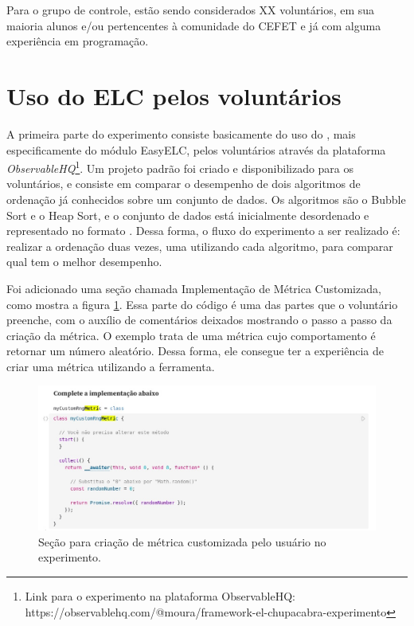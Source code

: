 \documentclass[12pt]{tcc}
\begin{document}
	Para o grupo de controle, estão sendo considerados XX voluntários, em sua maioria alunos e/ou pertencentes à comunidade do CEFET e já com alguma experiência em programação. 


	\section{Uso do ELC pelos voluntários}
	\label{section:parte-1-experimento}




	A primeira parte do experimento consiste basicamente do uso do , mais especificamente do módulo EasyELC, pelos voluntários através da plataforma \emph{ObservableHQ}\footnote{Link para o experimento na plataforma ObservableHQ: https://observablehq.com/@moura/framework-el-chupacabra-experimento}. Um projeto padrão foi criado e disponibilizado para os voluntários, e consiste em comparar o desempenho de dois algoritmos de ordenação já conhecidos sobre um conjunto de dados. Os algoritmos são o Bubble Sort e o Heap Sort, e o conjunto de dados está inicialmente desordenado e representado no formato . Dessa forma, o fluxo do experimento a ser realizado é: realizar a ordenação duas vezes, uma utilizando cada algoritmo, para comparar qual tem o melhor desempenho.

	Foi adicionado uma seção chamada Implementação de Métrica Customizada, como mostra a figura \ref{fig:metrica-observable}. Essa parte do código é uma das partes que o voluntário preenche, com o auxílio de comentários deixados mostrando o passo a passo da criação da métrica. O exemplo trata de uma métrica cujo comportamento é retornar um número aleatório. Dessa forma, ele consegue ter a experiência de criar uma métrica utilizando a ferramenta.

	\begin{figure}[!ht]
		\centering
		\includegraphics[width=1\textwidth]{figures/experimento-metrica.jpeg}
		\caption{Seção para criação de métrica customizada pelo usuário no experimento.}
		\label{fig:metrica-observable}
	\end{figure}
\end{document}
